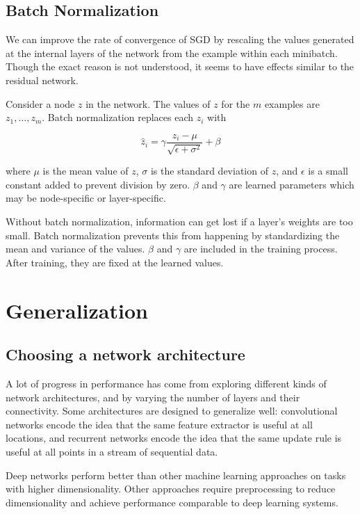 \documentclass{article}
\begin{document}
\subsection{Batch Normalization}

We can improve the rate of convergence of SGD by rescaling the values generated at the 
internal layers of the network from the example within each minibatch. Though the exact
reason is not understood, it seems to have effects similar to the residual network.

Consider a node $z$ in the network. The values of $z$ for the $m$ examples are $z_1, \dots, z_m$.
Batch normalization replaces each $z_i$ with

\[
\hat z_i = \gamma \frac{z_i - \mu}{\sqrt{\epsilon + \sigma^2}} + \beta
\]

where $\mu$ is the mean value of $z$, $\sigma$ is the standard deviation of $z$, and
$\epsilon$ is a small constant added to prevent division by zero. $\beta$ and $\gamma$
are learned parameters which may be node-specific or layer-specific.

Without batch normalization, information can get lost if a layer's weights are too
small.  Batch normalization prevents this from happening by standardizing the mean
and variance of the values. $\beta$ and $\gamma$ are included in the training process.
After training, they are fixed at the learned values.

\section{Generalization}

\subsection{Choosing a network architecture}

A lot of progress in performance has come from exploring different kinds of network 
architectures, and by varying the number of layers and their connectivity. Some
architectures are designed to generalize well: convolutional networks encode the 
idea that the same feature extractor is useful at all locations, and recurrent
networks encode the idea that the same update rule is useful at all points in 
a stream of sequential data.

Deep networks perform better than other machine learning approaches on tasks with
higher dimensionality. Other approaches require preprocessing to reduce dimensionality
and achieve performance comparable to deep learning systems.
\end{document}
